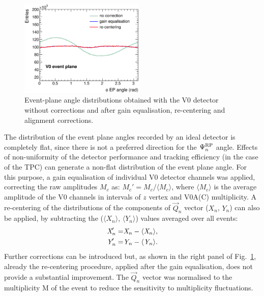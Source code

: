 \begin{figure}
\centering
 \includegraphics[width=0.53\textwidth]{FigCap5/V0EvPlaneDitrib.eps}
 \caption{Event-plane angle distributions obtained with the V0 detector without corrections and after gain equalisation, re-centering and alignment corrections.}
   \label{fig:QoverMCalibration}
\end{figure}



The distribution of the event plane angles recorded by an ideal detector is completely
flat, since there is not a preferred direction for the $\Psi_n^{\rm RP}$ angle.
Effects of non-uniformity of the detector performance and tracking efficiency (in the case of the TPC) 
can generate a non-flat distribution of the event plane angle. 
For this purpose, a gain equalisation of individual 
V0 detector channels was applied, correcting the raw amplitudes $M_c$ 
as: $M_c' = M_c / \langle M_c \rangle$, where $\langle M_c \rangle$ is the average amplitude
of the V0 channels in intervals of $z$ vertex and V0A(C) multiplicity. 
A re-centering of the distributions of the components
of $\vec{Q}_n$ vector ($X_n$, $Y_n$) can also be applied, by subtracting
the ($\langle X_n\rangle$, $\langle Y_n \rangle$) values averaged over all events:
\begin{equation}
\begin{split}
\emph{{X}}_n' =& \emph{X}_n - \langle \emph{X}_n \rangle,\\
\emph{{Y}}_n' = &\emph{Y}_n - \langle \emph{Y}_n \rangle.
\end{split}
\end{equation}
Further corrections can be introduced but, as shown in the right panel of 
Fig.~\ref{fig:QoverMCalibration}, already the re-centering
procedure, applied after the gain equalisation, does not provide a substantial improvement.
The $\vec{Q}_n$ vector was normalised to the
multiplicity M of the event to reduce the sensitivity to multiplicity
fluctuations. 



